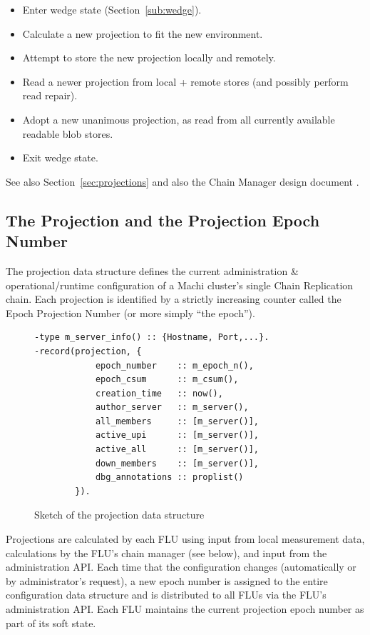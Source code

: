 \documentclass[preprint,10pt]{sigplanconf}
\begin{document}
\begin{itemize}
\item Enter wedge state (Section~\ref{sub:wedge}).
\item Calculate a new projection to fit the new environment.
\item Attempt to store the new projection locally and remotely.
\item Read a newer projection from local + remote stores (and possibly
  perform read repair).
\item Adopt a new unanimous projection, as read from all
  currently available readable blob stores.
\item Exit wedge state.
\end{itemize}

See also Section~\ref{sec:projections} and also the Chain Manager
design document \cite{machi-chain-manager-design}.

\subsection{The Projection and the Projection Epoch Number}
\label{sub:projection}

The projection data
structure defines the current administration \& operational/runtime
configuration of a Machi cluster's single Chain Replication chain.
Each projection is identified by a strictly increasing counter called
the Epoch Projection Number (or more simply ``the epoch'').

\begin{figure}
\begin{verbatim}
-type m_server_info() :: {Hostname, Port,...}.
-record(projection, {
            epoch_number    :: m_epoch_n(),
            epoch_csum      :: m_csum(),
            creation_time   :: now(),
            author_server   :: m_server(),
            all_members     :: [m_server()],
            active_upi      :: [m_server()],
            active_all      :: [m_server()],
            down_members    :: [m_server()],
            dbg_annotations :: proplist()
        }).
\end{verbatim}
\caption{Sketch of the projection data structure}
\label{fig:projection}
\end{figure}

Projections are calculated by each FLU using input from local
measurement data, calculations by the FLU's chain manager
(see below), and input from the administration API.
Each time that the configuration changes (automatically or by
administrator's request), a new epoch number is assigned
to the entire configuration data structure and is distributed to
all FLUs via the FLU's administration API.  Each FLU maintains the
current projection epoch number as part of its soft state.
\end{document}
